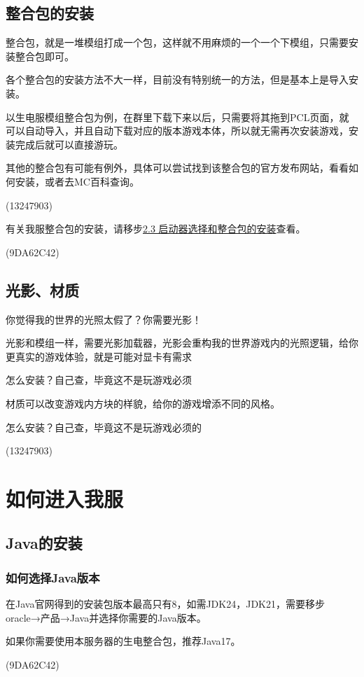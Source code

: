 \documentclass[UTF8,a4paper]{article}
\begin{document}
		\subsection{整合包的安装}
			\par 整合包，就是一堆模组打成一个包，这样就不用麻烦的一个一个下模组，只需要安装整合包即可。
			\par 各个整合包的安装方法不大一样，目前没有特别统一的方法，但是基本上是导入安装。
			\par 以生电服模组整合包为例，在群里下载下来以后，只需要将其拖到PCL页面，就可以自动导入，并且自动下载对应的版本游戏本体，所以就无需再次安装游戏，安装完成后就可以直接游玩。
			\par 其他的整合包有可能有例外，具体可以尝试找到该整合包的官方发布网站，看看如何安装，或者去MC百科查询。
			\begin{flushright}(13247903)\end{flushright}
			\par 有关我服整合包的安装，请移步\hyperlink{2.3}{2.3 启动器选择和整合包的安装}查看。
			\begin{flushright}(9DA62C42)\end{flushright}
		\subsection{光影、材质}
			\hypertarget{1.7}{}
			\par 你觉得我的世界的光照太假了？你需要光影！
			\par 光影和模组一样，需要光影加载器，光影会重构我的世界游戏内的光照逻辑，给你更真实的游戏体验，就是可能对显卡有需求
			\par 怎么安装？自己查，毕竟这不是玩游戏必须
			\par 材质可以改变游戏内方块的样貌，给你的游戏增添不同的风格。
			\par 怎么安装？自己查，毕竟这不是玩游戏必须的
			\begin{flushright}(13247903)\end{flushright}


	\section{如何进入我服}
		\subsection{Java的安装}
			\subsubsection{如何选择Java版本}
				\par 在Java官网得到的安装包版本最高只有8，如需JDK24，JDK21，需要移步oracle→产品→Java并选择你需要的Java版本。
				\par 如果你需要使用本服务器的生电整合包，推荐Java17。
				\begin{flushright}(9DA62C42)\end{flushright}
\end{document}
